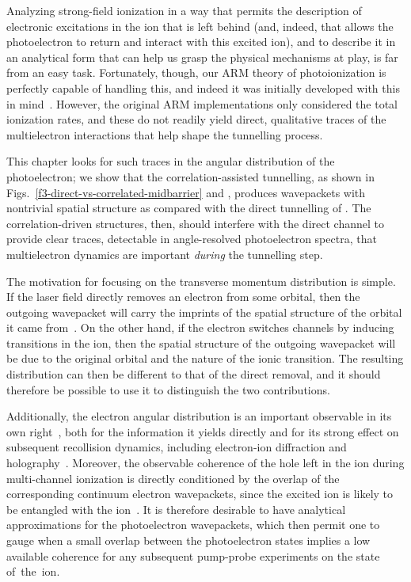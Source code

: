 Analyzing strong-field ionization in a way that permits the description of electronic excitations in the ion that is left behind (and, indeed, that allows the photoelectron to return and interact with this excited ion), and to describe it in an analytical form that can help us grasp the physical mechanisms at play, is far from an easy task. Fortunately, though, our ARM theory of photoionization is perfectly capable of handling this, and indeed it was initially developed with this in mind~\cite{ ARM_initial_multielectron}. However, the original ARM implementations only considered the total ionization rates, and these do not readily yield direct, qualitative traces of the multielectron interactions that help shape the tunnelling process.

This chapter looks for such traces in the angular distribution of the photoelectron; we show that the correlation-assisted tunnelling, as shown in Figs.~\ref{f3-direct-vs-correlated-midbarrier} and , produces wavepackets with nontrivial spatial structure as compared with the direct tunnelling of . The correlation-driven structures, then, should interfere with the direct channel to provide clear traces, detectable in angle-resolved photoelectron spectra, that multielectron dynamics are important \textit{during} the tunnelling step.


The motivation for focusing on the transverse momentum distribution is simple. If the laser field directly removes an electron from some orbital, then the outgoing wavepacket  will carry the imprints of the spatial structure of the orbital it came from~\cite{meckel_LIED_2008}. On the other hand, if the electron switches channels by inducing transitions in the ion, then the spatial structure of the outgoing wavepacket will be due to the original orbital and the nature of the ionic transition. The resulting distribution can then be different to that of the direct removal, and it should therefore be possible to use it to distinguish the two contributions.

Additionally, the electron angular distribution is an important observable in its own right~\cite{meckel_LIED_2008, pavicic_angular-dependence-measurement_2007, zhou_angular-dependence-theory_2005, zhao_molecular-orbital-theory_2011}, both for the information it yields directly and for its strong effect on subsequent recollision dynamics, including electron-ion diffraction and holography~\cite{spanner_reading-diffraction-images_2004, yurchenko_laser-induced-rescattering_2004, blaga_imaging_2012, huismans_holography-2011}. Moreover, the observable coherence of the hole left in the ion during multi-channel ionization is directly conditioned by the overlap of the corresponding continuum electron wavepackets, since the excited ion is likely to be entangled with the ion~\cite{ruberti_thesis_2004}. It is therefore desirable to have analytical approximations for the photoelectron wavepackets, which then permit one to gauge when a small overlap between the photoelectron states implies a low available coherence for any subsequent pump-probe experiments on the state of~the~ion.


